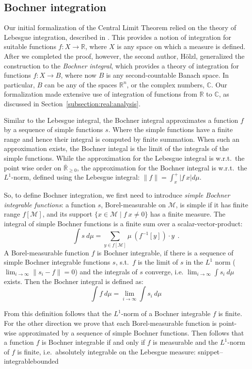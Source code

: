 \documentclass{svjour3}
\newcommand{\RR}{\mathbb{R}}
\newcommand{\CC}{\mathbb{C}}
\newcommand{\ennRR}{\overline{\mathbb{R}}_{\ge 0}}
\newcommand{\mdl}[1]{{\mathcal #1}} %
\newcommand{\Snippet}[1]{\csname snippet--#1\endcsname}
\begin{document}
\subsection{Bochner integration}
\label{subsection:bochner}

Our initial formalization of the Central Limit Theorem relied on the theory of Lebesgue integration, described in \cite{hoelzl:heller:11}. This provides a notion of integration for suitable functions $f : X \to \RR$, where $X$ is any space on which a measure is defined. After we completed the proof, however, the second author, H\"olzl, generalized the construction to the \emph{Bochner integral}, which provides a theory of integration for functions $f : X \to B$, where now $B$ is any second-countable Banach space. In particular, $B$ can be any of the spaces $\RR^n$, or the complex numbers, $\CC$. Our formalization made extensive use of integration of functions from $\RR$ to $\CC$, as discussed in Section~\ref{subsection:real:analysis}.

Similar to the Lebesgue integral, the Bochner integral approximates a function $f$ by a sequence of simple functions $s$. Where the simple functions have a finite range and hence their integral is computed by finite summation. When such an approximation exists, the Bochner integal is the limit of the integrals of the simple functions. While the approximation for the Lebesgue integral is w.r.t.~the point wise order on $\ennRR$, the approximation for the Bochner integral is w.r.t.~the $L^1$-norm, defined using the Lebesgue integral: $\lVert f \rVert = \int_x^+ |f~x| d\mu$.

So, to define Bochner integration, we first need to introduce \emph{simple Bochner integrable functions}: a function $s$, Borel-measurable on $\mdl M$, is simple if it has finite range $f[\mdl M]$, and its support $\{x \in \mdl M \mid f~x \not= 0\}$ has a finite measure. The integral of simple Bochner functions is a finite sum over a scalar-vector-product:
\[ \int s~d\mu = \sum_{ y \in f[\mdl M]} \mu~(f^{-1}[y]) \cdot y~~.\]
A Borel-measurable function $f$ is Bochner integrable, if there is a sequence of simple Bochner integrable functions $s$, s.t.~$f$ is the limit of $s$ in the $L^1$ norm ($\lim_{i \rightarrow \infty} \lVert s_i - f \rVert = 0$) and the integrals of $s$ converge, i.e. $\lim_{i \rightarrow \infty} \int s_i ~d\mu$ exists. Then the Bochner integral is defined as:
\[ \int f~d\mu = \lim_{i \rightarrow \infty} \int s_i ~d\mu \]

From this definition follows that the $L^1$-norm of a Bochner integrable $f$ is finite. For the other direction we prove that each Borel-measurable function is point-wise approximated by a sequence of simple Bochner functions. Then follows that a function $f$ is Bochner integrable if and only if $f$ is measurable and the $L^1$-norm of $f$ is finite, i.e.~absolutely integrable on the Lebesgue measure:
\Snippet{integrablebounded}
\end{document}
